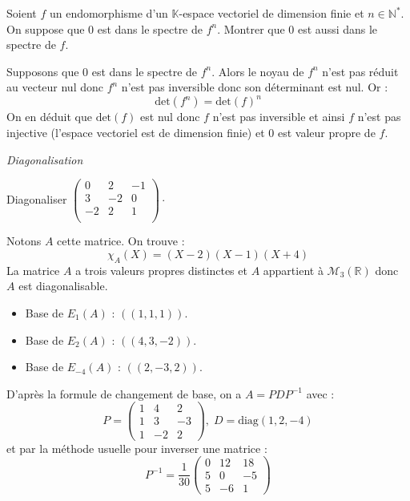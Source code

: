 \documentclass[a4paper,10pt]{report}
\begin{document}
\begin{Exercice}{} Soient $f$ un endomorphisme d'un $\mathbb{K}$-espace vectoriel de dimension finie et $n \in \mathbb{N}^{*}$. On suppose que $0$ est dans le spectre de $f^n$. Montrer que $0$ est aussi dans le spectre de $f$.
\end{Exercice}

\corr Supposons que $0$ est dans le spectre de $f^n$. Alors le noyau de $f^n$ n'est pas réduit au vecteur nul donc $f^n$ n'est pas inversible donc son déterminant est nul. Or :
$$ \textrm{det}(f^n) = \textrm{det}(f)^n$$
On en déduit que $\textrm{det}(f)$ est nul donc $f$ n'est pas inversible et ainsi $f$ n'est pas injective (l'espace vectoriel est de dimension finie) et $0$ est valeur propre de $f$.

\medskip

\begin{center}
\textit{{ {\large Diagonalisation}}}
\end{center}

\medskip

\begin{Exercice}{} Diagonaliser $\begin{pmatrix}
0 & 2 & -1 \\
3 & -2 & 0 \\
-2 & 2 & 1 \\
\end{pmatrix}\cdot$
\end{Exercice}

\corr Notons $A$ cette matrice. On trouve :
$$ \chi_A(X) = (X-2)(X-1)(X+4)$$
La matrice $A$ a trois valeurs propres distinctes et $A$ appartient à $\mathcal{M}_3(\mathbb{R})$ donc $A$ est diagonalisable.
\begin{itemize}
\item Base de $E_1(A)$ : $((1,1,1))$.
\item Base de $E_2(A)$ : $((4,3,-2))$.
\item Base de $E_{-4}(A)$ : $((2,-3,2))$.
\end{itemize}
D'après la formule de changement de base, on a $A = PDP^{-1}$ avec :
$$ P = \begin{pmatrix}
1 & 4 & 2 \\
1 & 3 & -3 \\
1 & -2 & 2
\end{pmatrix}, \; D=\textrm{diag}(1,2,-4)$$
et par la méthode usuelle pour inverser une matrice :
$$ P^{-1} = \dfrac{1}{30} \begin{pmatrix}
0 & 12 & 18 \\
5 & 0 & -5 \\
5 & -6 & 1 
\end{pmatrix}$$
\end{document}
